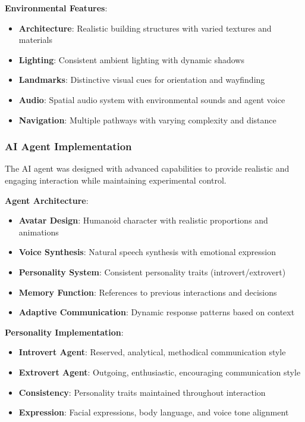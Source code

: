 \documentclass[12pt]{article}
\begin{document}
\textbf{Environmental Features}:
\begin{itemize}
    \item \textbf{Architecture}: Realistic building structures with varied textures and materials
    \item \textbf{Lighting}: Consistent ambient lighting with dynamic shadows
    \item \textbf{Landmarks}: Distinctive visual cues for orientation and wayfinding
    \item \textbf{Audio}: Spatial audio system with environmental sounds and agent voice
    \item \textbf{Navigation}: Multiple pathways with varying complexity and distance
\end{itemize}

\subsubsection{AI Agent Implementation}

The AI agent was designed with advanced capabilities to provide realistic and engaging interaction while maintaining experimental control.

\textbf{Agent Architecture}:
\begin{itemize}
    \item \textbf{Avatar Design}: Humanoid character with realistic proportions and animations
    \item \textbf{Voice Synthesis}: Natural speech synthesis with emotional expression
    \item \textbf{Personality System}: Consistent personality traits (introvert/extrovert)
    \item \textbf{Memory Function}: References to previous interactions and decisions
    \item \textbf{Adaptive Communication}: Dynamic response patterns based on context
\end{itemize}

\textbf{Personality Implementation}:
\begin{itemize}
    \item \textbf{Introvert Agent}: Reserved, analytical, methodical communication style
    \item \textbf{Extrovert Agent}: Outgoing, enthusiastic, encouraging communication style
    \item \textbf{Consistency}: Personality traits maintained throughout interaction
    \item \textbf{Expression}: Facial expressions, body language, and voice tone alignment
\end{itemize}
\end{document}
